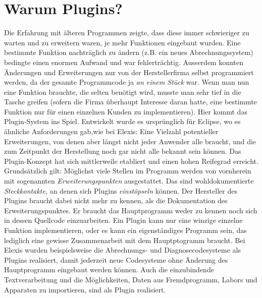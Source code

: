 
\section{Warum Plugins?}
\label{expl:plugins}
Die Erfahrung mit älteren Programmen zeigte, dass diese immer schwieriger zu warten und zu erweitern waren, je mehr Funktionen eingebaut wurden. Eine bestimmte Funktion nachträglich zu ändern (z.B. ein neues Abrechnungssystem) bedingte einen enormen Aufwand und war fehlerträchtig. Ausserdem konnten Änderungen und Erweiterungen nur von der Herstellerfirma selbst programmiert werden, da der gesamte Programmcode ja \textit{an einem Stück} war. Wenn man nun eine Funktion brauchte, die selten benötigt wird, musste man sehr tief in die Tasche greifen (sofern die Firma überhaupt Interesse daran hatte, eine bestimmte Funktion nur für einen einzelnen Kunden zu implementieren).
Hier kommt das Plugin-System ins Spiel. Entwickelt wurde es ursprünglich für Eclipse, wo es ähnliche Anforderungen gab,wie bei Elexis: Eine Vielzahl potentieller Erweiterungen, von denen aber längst nicht jeder Anwender alle braucht, und die zum Zeitpunkt der Herstellung noch gar nicht alle bekannt sein können. Das Plugin-Konzept hat sich mittlerweile etabliert und einen hohen Reifegrad erreicht.
Grundsätzlich gilt: Möglichst viele Stellen im Programm werden von vornherein mit sogenannten \textit{Erweiterungspunkten} ausgestattet. Das sind wohldokumentierte \textit{Steckkontakte}, an denen sich Plugins \textit{einstöpseln} können. Der Hersteller des Plugins braucht dabei nicht mehr zu kennen, als die Dokumentation des Erweiterungspunktes. Er braucht das Hauptprogramm weder zu kennen noch sich in dessen Quellcode einzuarbeiten. Ein Plugin kann nur eine winzige einzelne Funktion implementieren, oder es kann ein eigenständiges Programm sein, das lediglich eine gewisse Zusammenarbeit mit dem Hauptptogramm braucht.
Bei Elexis wurden beispielsweise die Abrechnungs- und Diagnosecodesysteme als Plugins realisiert, damit jederzeit neue Codesysteme ohne Änderung des Hauptprogramm eingebaut werden können. Auch die einzubindende Textverarbeitung und die Möglichkeiten, Daten aus Fremdprogramm, Labors und Apparaten zu importieren, sind als Plugin realisiert.
